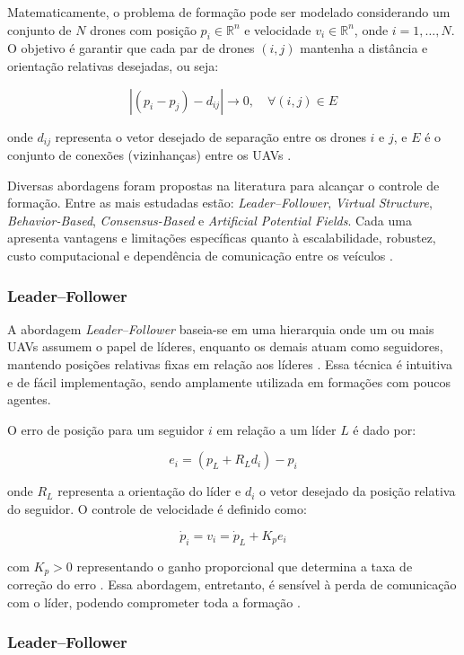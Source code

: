 \documentclass[portuguese]{sbcreviews-2025}%
\begin{document}
Matematicamente, o problema de formação pode ser modelado considerando um conjunto de $N$ drones com posição $p_i \in \mathbb{R}^n$ e velocidade $v_i \in \mathbb{R}^n$, onde $i = 1, \dots, N$. O objetivo é garantir que cada par de drones $(i, j)$ mantenha a distância e orientação relativas desejadas, ou seja:

\[
| (p_i - p_j) - d_{ij} | \to 0, \quad \forall (i, j) \in E
\]

onde $d_{ij}$ representa o vetor desejado de separação entre os drones $i$ e $j$, e $E$ é o conjunto de conexões (vizinhanças) entre os UAVs \cite{bu2024advancement, ouyang2023formation}.

Diversas abordagens foram propostas na literatura para alcançar o controle de formação. Entre as mais estudadas estão: \textit{Leader–Follower}, \textit{Virtual Structure}, \textit{Behavior-Based}, \textit{Consensus-Based} e \textit{Artificial Potential Fields}. Cada uma apresenta vantagens e limitações específicas quanto à escalabilidade, robustez, custo computacional e dependência de comunicação entre os veículos \cite{bu2024advancement, ouyang2023formation}.

\subsubsection{Leader–Follower}

A abordagem \textit{Leader–Follower} baseia-se em uma hierarquia onde um ou mais UAVs assumem o papel de líderes, enquanto os demais atuam como seguidores, mantendo posições relativas fixas em relação aos líderes \cite{bu2024advancement}. Essa técnica é intuitiva e de fácil implementação, sendo amplamente utilizada em formações com poucos agentes.

O erro de posição para um seguidor $i$ em relação a um líder $L$ é dado por:

\[
e_i = (p_L + R_L d_i) - p_i
\]

onde $R_L$ representa a orientação do líder e $d_i$ o vetor desejado da posição relativa do seguidor. O controle de velocidade é definido como:

\[
\dot{p}_i = v_i = \dot{p}_L + K_p e_i
\]

com $K_p > 0$ representando o ganho proporcional que determina a taxa de correção do erro \cite{bu2024advancement}. Essa abordagem, entretanto, é sensível à perda de comunicação com o líder, podendo comprometer toda a formação \cite{ouyang2023formation}.


\subsubsection{Leader–Follower}
\end{document}
